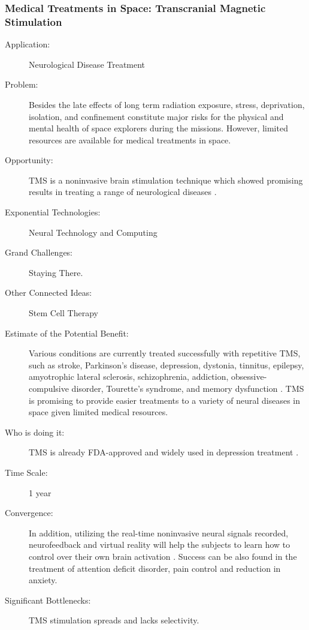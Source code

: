 \subsubsection{Medical Treatments in Space:  Transcranial Magnetic Stimulation}
\label{neuro-treat}
\begin{description}  \item[Application:] Neurological Disease Treatment
 
\item[Problem:] Besides the late  effects of long term radiation exposure, stress, deprivation, isolation,  and confinement constitute major risks for the physical and mental  health of space explorers during the missions. However, limited  resources are available for medical treatments in space.
 
\item[Opportunity:]  \gls{TMS} is a noninvasive brain  stimulation technique which showed promising results in treating a range  of neurological diseases \cite{Ridding2007}.
 
\item[Exponential Technologies:]  Neural Technology and Computing
 
\item[Grand Challenges:] Staying There.
 
\item[Other  Connected Ideas:] Stem Cell Therapy
 
\item[Estimate of the Potential  Benefit:]Various conditions are currently treated successfully with  repetitive \gls{TMS}, such as stroke, Parkinson's disease, depression,  dystonia, tinnitus, epilepsy, amyotrophic lateral sclerosis,  schizophrenia, addiction, obsessive-compulsive disorder, Tourette's syndrome, and memory dysfunction \cite{Ridding2007}. \gls{TMS} is promising to provide  easier treatments to a variety of neural diseases in space given limited  medical resources.
 
\item[Who  is doing it:] \gls{TMS} is already \gls{FDA}-approved and widely used in depression  treatment \cite{Ridding2007}.
 
\item[Time Scale:] 1 year
 
\item[Convergence:]  In addition, utilizing the real-time noninvasive neural signals  recorded, neurofeedback and virtual reality will help the subjects to  learn how to control over their own brain activation  \cite{deCharms2008}. Success can be also found in the treatment of  attention deficit disorder, pain control and reduction in anxiety. 
 
\item[Significant  Bottlenecks:] \gls{TMS} stimulation spreads and lacks selectivity. 
 
\end{description}

